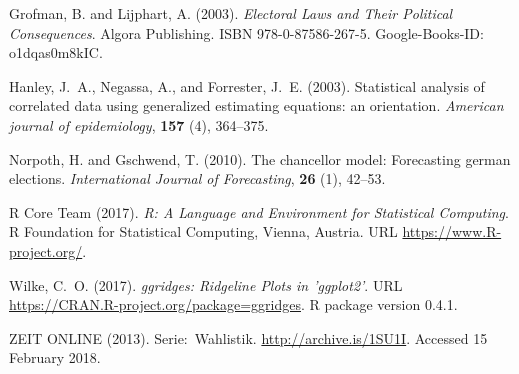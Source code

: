 \documentclass[smallextended]{svjour3}      %
\begin{document}
\begin{thebibliography}{13}
{\rm Grofman, B. {\rm and} Lijphart, A.} (2003).
\newblock \emph{Electoral {Laws} and {Their} {Political} {Consequences}}.
\newblock Algora Publishing.
\newblock ISBN 978-0-87586-267-5.
\newblock Google-Books-ID: o1dqas0m8kIC.

{\rm Hanley, J.~A., Negassa, A., {\rm and} Forrester, J.~E.} (2003).
\newblock Statistical analysis of correlated data using generalized estimating
  equations: an orientation.
\newblock \emph{American journal of epidemiology}, {\bf 157} (4),
   364--375.

{\rm Norpoth, H. {\rm and} Gschwend, T.} (2010).
\newblock The chancellor model: Forecasting german elections.
\newblock \emph{International Journal of Forecasting}, {\bf 26} (1),
   42--53.

{\rm {R Core Team}} (2017).
\newblock \emph{R: A Language and Environment for Statistical Computing}.
\newblock R Foundation for Statistical Computing, Vienna, Austria.
\newblock URL \url{https://www.R-project.org/}.

{\rm Wilke, C.~O.} (2017).
\newblock \emph{ggridges: Ridgeline Plots in 'ggplot2'}.
\newblock URL \url{https://CRAN.R-project.org/package=ggridges}.
\newblock R package version 0.4.1.

{\rm {ZEIT ONLINE}} (2013).
\newblock Serie:~{W}ahlistik.
\newblock \url{http://archive.is/1SU1I}.
\newblock Accessed 15 February 2018.

\end{thebibliography}
\end{document}
